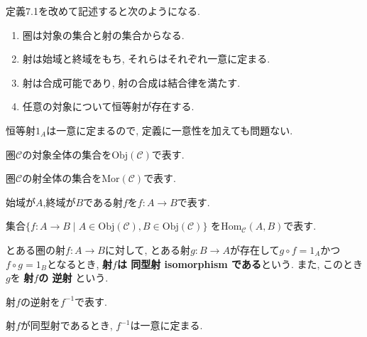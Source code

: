 \begin{caution}定義7.1を改めて記述すると次のようになる.
\begin{enumerate}
\item
圏は対象の集合と射の集合からなる.
\item
射は始域と終域をもち, それらはそれぞれ一意に定まる.
\item
射は合成可能であり, 射の合成は結合律を満たす.
\item
任意の対象について恒等射が存在する.
\end{enumerate}
\end{caution}
\begin{caution}
恒等射$1_{A}$は一意に定まるので, 定義に一意性を加えても問題ない.
\end{caution}
\begin{Notation}
圏$\mathscr{C}$の対象全体の集合を$\mathrm{Obj}(\mathscr{C})$で表す.
\end{Notation}
\begin{Notation}
圏$\mathscr{C}$の射全体の集合を$\mathrm{Mor}(\mathscr{C})$で表す.
\end{Notation}

\begin{Notation}
始域が$A$,終域が$B$である射$f$を$f:A\rightarrow B$で表す.
\end{Notation}
\begin{Notation}
集合$\{f:A\rightarrow B\mid A\in\mathrm{Obj}(\mathscr{C}), B\in\mathrm{Obj}(\mathscr{C})\}$
を$\mathrm{Hom}_{\mathscr{C}}(A,B)$で表す.
\end{Notation}
\begin{Def}
とある圏の射$f:A\rightarrow B$に対して,
とある射$g:B\rightarrow A$が存在して$g\circ f=1_A$かつ$f\circ g=1_B$となるとき,
{\bf 射$f$は
同型射 isomorphism 
である}という. また, このとき$g$を
{\bf 射$f$の
逆射
}という.
\end{Def}
\begin{Notation}
射$f$の逆射を$f^{-1}$で表す.
\end{Notation}
\begin{Prop}\label{Prop:同型射の一意性}
射$f$が同型射であるとき, $f^{-1}$は一意に定まる.
\end{Prop}
\begin{comment}
\begin{proof}
\end{proof}
\end{comment}

